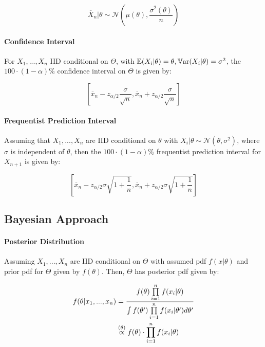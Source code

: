 \documentclass[a4paper]{article}
\begin{document}
                \[
                    \overline X_n | \theta \sim \mathcal{N}\left(\mu(\theta),
                    \frac{\sigma^2(\theta)}{n}\right)
                \]

            \paragraph{Confidence Interval}
                For $X_1, ..., X_n$ IID conditional on $\Theta$, with $\mathbb{E}(X_i |
                \theta) = \theta, \mathbb{V}\text{ar}(X_i | \theta) = \sigma^2$, the $100 \cdot
                (1 - \alpha)\%$ confidence interval on $\Theta$ is given by:

                \[
                    \left[\overline x_n - z_{\alpha/2}\frac{\sigma}{\sqrt{n}},
                    \overline x_n + z_{\alpha/2} \frac{\sigma}{\sqrt{n}}\right]
                \]

            \paragraph{Frequentist Prediction Interval}
                Assuming that $X_1, ..., X_n$ are IID conditional on $\theta$
                with $X_i | \theta \sim \mathcal{N}(\theta, \sigma^2)$, where
                $\sigma$ is independent of $\theta$, then the $100 \cdot (1 -
                \alpha)\%$ frequentist prediction interval for $X_{n+1}$ is
                given by:

                \[
                    \left[\overline x_n - z_{\alpha/2} \sigma \sqrt{1 +
                    \frac{1}{n}}, \overline x_n + z_{\alpha/2} \sigma \sqrt{1 +
                    \frac{1}{n}}\right]
                \]

        \subsection*{Bayesian Approach}
            \paragraph{Posterior Distribution}
                Assuming $X_1, ..., X_n$ are IID conditional on $\Theta$ with
                assumed pdf $f(x | \theta)$ and prior pdf for $\Theta$ given by
                $f(\theta)$. Then, $\Theta$ has posterior pdf given by:

                \begin{align*}
                    f(\theta | x_1, ..., x_n) & = \frac{f(\theta)
                        \prod\limits_{i=1}^n f(x_i | \theta)}{\int f(\theta')
                        \prod\limits_{i=1}^n f(x_i | \theta') d\theta'} \\
                    & \stackrel{({\theta})}{\propto} f(\theta) \cdot \prod_{i=1}^n f(x_i |
                        \theta)
                \end{align*}
\end{document}
